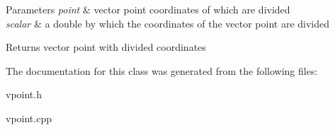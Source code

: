\begin{DoxyParams}{Parameters}
{\em point} & vector point coordinates of which are divided \\
\hline
{\em scalar} & a double by which the coordinates of the vector point are divided \\
\hline
\end{DoxyParams}
\begin{DoxyReturn}{Returns}
vector point with divided coordinates 
\end{DoxyReturn}


The documentation for this class was generated from the following files\+:\begin{DoxyCompactItemize}
\item 
vpoint.\+h\item 
vpoint.\+cpp\end{DoxyCompactItemize}
